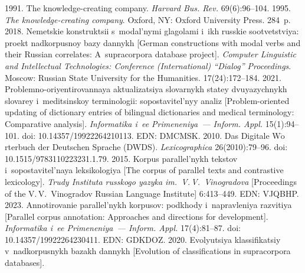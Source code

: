   \begin{multicols}{2}

\renewcommand{\bibname}{\protect\rmfamily References}

{\small\frenchspacing
 {%
 \begin{thebibliography}{99} 
 1991. The knowledge-creating company. \textit{Harvard Bus. Rev.}  69(6):96--104.
 1995. \textit{The knowledge-creating company}. Oxford, NY: 
Oxford University Press. 284~p.
 2018. Nemetskie konstruktsii s~modal'nymi 
glagolami i~ikh russkie sootvetstviya: proekt nadkorpusnoy bazy dannykh [German constructions with 
modal verbs and their Russian correlates: A~supracorpora database project]. \textit{Computer Linguistic 
and Intellectual Technologies: Conference (International) ``Dialog'' Proceedings}. Moscow: Russian State University for the
Humanities.   17(24):172--184.
 2021. Problemno-oriyentirovannaya aktualizatsiya slovarnykh statey 
dvuyazychnykh slovarey i~me\-di\-tsin\-skoy terminologii: sopostavitel'nyy analiz [Problem-oriented 
updating of dictionary entries of bilingual \mbox{dictionaries} and medical terminology: Comparative analysis]. 
\textit{Informatika i~ee Primeneniya~--- Inform. \mbox{Appl.}} 15(1):94--101. doi: 10.14357/19922264210113. 
EDN: DMCMSK.
 2010. Das Digitale W$\ddot{\mbox{o}}$rterbuch der Deutschen Sprache 
(DWDS).  \textit{Lexicographica} 26(2010):79--96. doi: 10.1515/9783110223231.1.79.
 2015. Korpus parallel'nykh tekstov i~sopostavitel'naya leksikologiya [The 
corpus of parallel texts and contrastive lexicology]. \textit{Trudy Instituta russkogo yazyka im.\ 
V.\,V.~Vinogradova} [Proceedings of the V.\,V.~Vinogradov Russian Language Institute] 6:413--449. 
EDN: VJQBHP.
 2023. Annotirovanie parallel'nykh korpusov: podkhody i~napravleniya 
razvitiya [Parallel corpus annotation: Approaches and directions for development]. \textit{Informatika 
i~ee Primeneniya~--- Inform. Appl.} 17(4):81--87. doi: 10.14357/19922264230411. EDN: GDKDOZ.
\bibitem{8-zac-1}
 2020. Evolyutsiya klassifikatsiy 
v~nadkorpusnykh ba\-zakh dan\-nykh [Evolution of classifications in supracorpora databases]. 

\end{thebibliography}}}
\end{multicols}

